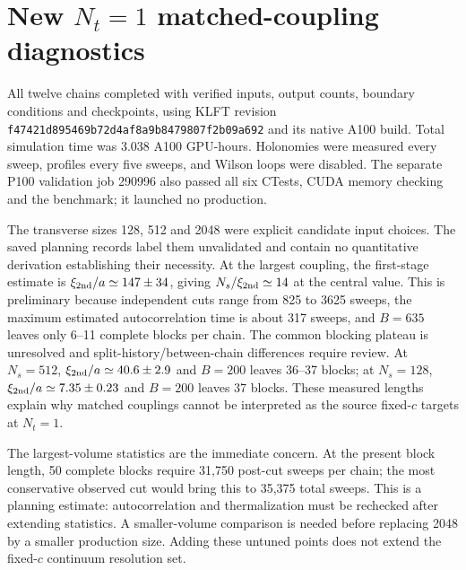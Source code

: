 \documentclass[11pt,a4paper]{article}
\begin{document}
\clearpage\section*{New $N_t=1$ matched-coupling diagnostics}
\begin{center}\small\end{center}
All twelve chains completed with verified inputs, output counts, boundary
conditions and checkpoints, using KLFT revision
\texttt{f47421d895469b72d4af8a9b8479807f2b09a692} and its native A100 build.
Total simulation time was 3.038 A100 GPU-hours. Holonomies were measured
every sweep, profiles every five sweeps, and Wilson loops were disabled.
The separate P100 validation job 290996 also passed all six CTests, CUDA
memory checking and the benchmark; it launched no production.

The transverse sizes 128, 512 and 2048 were explicit candidate input
choices. The saved planning records label them unvalidated and contain no
quantitative derivation establishing their necessity. At the largest
coupling, the first-stage estimate is $\xi_{\rm 2nd}/a\simeq147\pm34$,
giving $N_s/\xi_{\rm 2nd}\simeq14$ at the central value. This is preliminary
because independent cuts range from 825 to 3625 sweeps, the maximum
estimated autocorrelation time is about 317 sweeps, and $B=635$ leaves
only 6--11 complete blocks per chain. The common blocking plateau is
unresolved and split-history/between-chain differences require review.
At $N_s=512$, $\xi_{\rm 2nd}/a\simeq40.6\pm2.9$ and $B=200$ leaves
36--37 blocks; at $N_s=128$, $\xi_{\rm 2nd}/a\simeq7.35\pm0.23$ and
$B=200$ leaves 37 blocks. These measured lengths explain why matched
couplings cannot be interpreted as the source fixed-$c$ targets at $N_t=1$.

The largest-volume statistics are the immediate concern. At the present
block length, 50 complete blocks require 31,750 post-cut sweeps per chain;
the most conservative observed cut would bring this to 35,375 total sweeps.
This is a planning estimate: autocorrelation and thermalization must be
rechecked after extending statistics. A smaller-volume comparison is needed
before replacing 2048 by a smaller production size. Adding these untuned
points does not extend the fixed-$c$ continuum resolution set.
\end{document}
